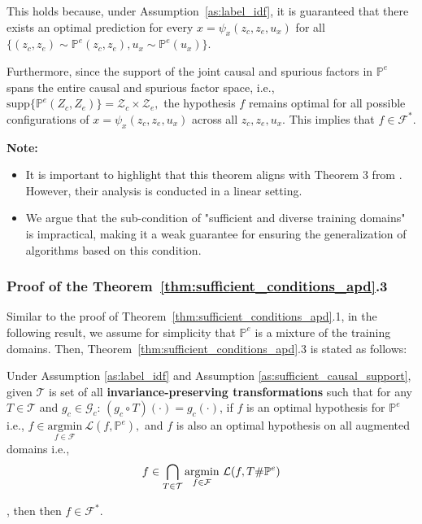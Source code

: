 This holds because, under Assumption~\ref{as:label_idf}, it is guaranteed that there exists an optimal prediction for every $x=\psi_x(z_c, z_e, u_x)$ for all $\{(z_c,z_e)\sim \mathbb{P}^{e}(z_c,z_e),u_x\sim \mathbb{P}^{e}(u_x)\}$.

Furthermore, since the support of the joint causal and spurious factors in \( \mathbb{P}^{e} \) spans the entire causal and spurious factor space, i.e., $\text{supp}\{\mathbb{P}^{e} (Z_c, Z_e)\} = \mathcal{Z}_c \times \mathcal{Z}_e,$ the hypothesis \( f \) remains optimal for all possible configurations of \( x = \psi_x(z_c, z_e, u_x) \) across all \( z_c, z_e, u_x \). This implies that \( f \in \mathcal{F}^* \).

\textbf{Note:} 
\begin{itemize}
    \item It is important to highlight that this theorem aligns with Theorem 3 from \citep{ahuja2021invariance}. However, their analysis is conducted in a linear setting.
    \item We argue that the sub-condition of "sufficient and diverse training domains" is impractical, making it a weak guarantee for ensuring the generalization of algorithms based on this condition.
\end{itemize}



\subsubsection{Proof of the Theorem~\ref{thm:sufficient_conditions_apd}.3}

Similar to the proof of Theorem~\ref{thm:sufficient_conditions_apd}.1, in the following result, we assume for simplicity that \( \mathbb{P}^e \) is a mixture of the training domains.
Then, Theorem~\ref{thm:sufficient_conditions_apd}.3 is stated as follows:

\begin{theorem}Under Assumption \ref{as:label_idf} and Assumption \ref{as:sufficient_causal_support}, given $\mathcal{T}$ is set of all \textbf{invariance-preserving transformations} such that for any $T\in \mathcal{T}$ and $g_c\in \mathcal{G}_c$: $(g_c\circ T)(\cdot)=g_c(\cdot)$,
if \( f\) is an optimal hypothesis for $\mathbb{P}^{e}$ i.e., $ f \in \underset{f \in \mathcal{F}}{\text{argmin}} \ \mathcal{L}(f, \mathbb{P}^{e}),$ and  $f$ is also an optimal hypothesis on all augmented domains i.e., $$f\in \bigcap_{T\in \mathcal{T}}\underset{f\in \mathcal{F}}{\text{argmin}} \ \mathcal{L}(f,T\#\mathbb{P}^{e})$$
 
, then then \( f \in \mathcal{F}^* \).
\end{theorem}

